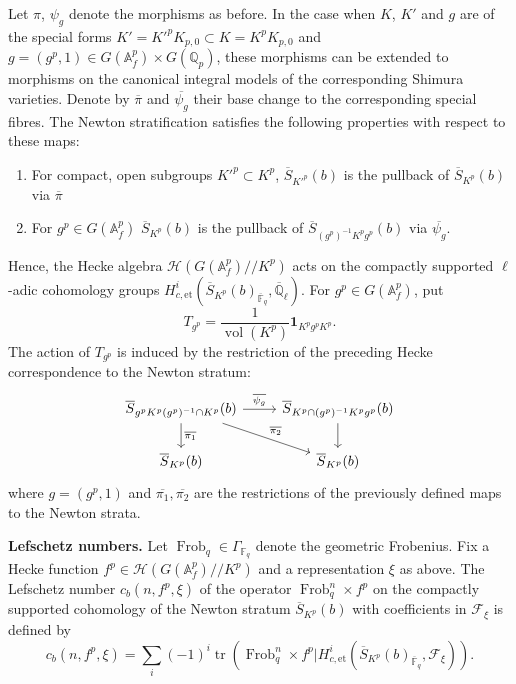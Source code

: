 \documentclass[11pt,a4paper]{article}
\theoremstyle{definition}
\theoremstyle{plain}
\theoremstyle{remark}
\theoremstyle{plain}
\DeclareMathOperator{\vol}{vol}
\DeclareMathOperator{\Frob}{Frob}
\DeclareMathOperator{\tr}{tr}
\begin{document}
Let $\pi$, $\psi_g$ denote the morphisms as before. In the case when $K$, $K'$ and $g$ are of the special forms $K' = K'^pK_{p,0} \subset K = K^p K_{p,0}$ and $g = (g^p, 1) \in G(\mathbb{A}_f^p) \times G(\mathbb{Q}_p)$, these morphisms can be extended to morphisms on the canonical integral models of the corresponding Shimura varieties. Denote by $\overline{\pi}$ and $\overline{\psi_g}$ their base change to the corresponding special fibres. The Newton stratification satisfies the following properties with respect to these maps:

\begin{enumerate}
    \item For compact, open subgroups $K'^p \subset K^p$, $\overline{S}_{K'^p}(b)$ is the pullback of $\overline{S}_{K^p}(b)$ via $\overline{\pi}$
    \item For $g^p \in G(\mathbb{A}_f^p)$ $\overline{S}_{K^p}(b)$ is the pullback of $\overline{S}_{(g^p)^{-1}K^pg^p}(b)$ via $\overline{\psi_g}$.
\end{enumerate}

Hence, the Hecke algebra $\mathcal{H}(G(\mathbb{A}_f^p) // K^p)$ acts on the compactly supported $\ell$-adic cohomology groups $H^i_{c,\mathrm{et}}(\overline{S}_{K^p}(b)_{\overline{\mathbb{F}}_q}, \overline{\mathbb{Q}}_\ell)$. For $g^p\in G(\mathbb{A}_f^p)$, put
$$
    T_{g^p}=\frac{1}{\vol(K^p)}\mathbf{1}_{K^pg^pK^p}.
$$
The action of $T_{g^p}$ is induced by the restriction of the preceding Hecke correspondence to the Newton stratum:
$$
\begin{tikzcd}
\overline{S}_{g^pK^p(g^p)^{-1} \cap K^p}(b) \arrow{d}{\overline{\pi_1}} \arrow{r}{\overline{\psi_g}} \arrow{dr}{\overline{\pi_2}} & \overline{S}_{K^p \cap (g^p)^{-1}K^pg^p}(b) \arrow{d} \\
\overline{S}_{K^p}(b) & \overline{S}_{K^p}(b)
\end{tikzcd}
$$
where $g=(g^p,1)$ and $\overline{\pi_1},\overline{\pi_2}$ are the restrictions of the previously defined maps to the Newton strata.

\textbf{Lefschetz numbers.}
Let $\Frob_q \in \Gamma_{\mathbb{F}_q}$ denote the geometric Frobenius. Fix a Hecke function $f^p \in \mathcal{H}(G(\mathbb{A}_f^p) // K^p)$ and a representation $\xi$ as above. The Lefschetz number $c_b(n, f^p, \xi)$ of the operator $\Frob_q^n \times f^p$ on the compactly supported cohomology of the Newton stratum $\overline{S}_{K^p}(b)$ with coefficients in $\mathcal{F}_{\xi}$ is defined by
$$
c_b(n,f^p,\xi) = \sum_i (-1)^i \tr\left(\Frob_q^n \times f^p \mathrel{\Big|} H^i_{c,\mathrm{et}}\left(\overline{S}_{K^p}(b)_{\overline{\mathbb{F}}_q}, \mathcal{F}_{\xi}\right)\right).
$$
\end{document}
